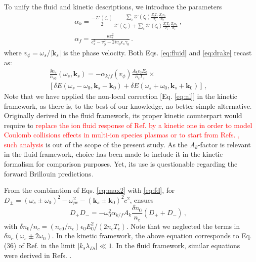 \documentclass[
 reprint,
 superscriptaddress,
 amsmath,amssymb,
 aps,
]{revtex4-1}
\def\tc{\textcolor{red}}
\begin{document}
To unify the fluid and kinetic descriptions, we introduce the parameters
\begin{align}
   \alpha_k  = \frac{-\mathcal{Z}'( \zeta_e) }{2}
 \frac{\sum_i\mathcal{Z}'( \zeta_i)\frac{  Z_iT_e}{ T_i }\frac{  Z_in_i}{ n_e }   }{  \mathcal{Z}'( \zeta_e)+ \sum_i\mathcal{Z}'( \zeta_i)\frac{  Z_iT_e}{ T_i }\frac{ Z_i n_i}{ n_e }  }\, ,\label{eq:alphak} \\
   \alpha_f = \frac{\kappa c_s^2}{ c_s^2-v_\phi^2 -2iv_\phi c_s \gamma_0}\, .\label{eq:alphaf}
\end{align}
where $v_\phi = \omega_s/\vert \mathbf{k}_s\vert $ is the phase velocity.
Both Eqs. \eqref{eq:fluid} and  \eqref{eq:drake} recast as:
\begin{align}
   \frac{\delta n_e }{n_{e0}}(\omega_s,\mathbf{k}_s) = -\alpha_{k/f}(v_\phi) \frac{A_k\epsilon_0 E_0}{n_c T_e}\times \nonumber\\ \left[\delta E(\omega_s-\omega_0, \mathbf{k}_s-\mathbf{k}_0) +\delta E(\omega_s+\omega_0, \mathbf{k}_s+\mathbf{k}_0) \right] \, ,\label{eq:fd}
\end{align}
Note that we have  applied the non-local correction [Eq. \eqref{eq:nl}] in the kinetic framework, as there is, to the best of our knowledge,  no better simple alternative. Originally derived in the fluid framework, its proper kinetic counterpart would require to \tc{replace the ion fluid response of Ref. \cite[]{POP_Berger_2005} by a kinetic one in order to model Coulomb collisions effects in multi-ion species plasmas \cite[]{POP_Berger_2005b} or to start from Refs. \cite[]{POP_Epperlein_94,POP_Bychenkov_1998}, such analysis } is out of the scope of the present study. As the $A_k$-factor is relevant in the fluid framework, choice has been made to include it in the kinetic formalism for comparison purposes. Yet, its use is questionable regarding the forward Brillouin predictions.

From the combination of  Eqs. \eqref{eq:max2} with \eqref{eq:fd}, 
for $D_\pm= (\omega_s\pm \omega_0)^2 - \omega_{pe}^2 -( \mathbf{k}_s\pm \mathbf{k}_0) ^2c^2 $, ensues
\begin{equation}\label{eq:dispe}
    D_+D_- = -\omega_{0}^2\alpha_{k/f}A_k\frac{\delta n_0}{n_c} (D_++D_-) \, ,
\end{equation}
with $\delta n_0/n_c = (n_{e0}/n_c) \epsilon_0E_0^2/(2n_c T_e)$.
Note that we neglected the terms in $\delta n_e(\omega_s \pm 2\omega_0)$.
In the kinetic framework, the above equation corresponds to Eq. (36) of Ref. \cite[]{POF_Cohen_79} in the limit $\vert k_s \lambda_{Di} \vert \ll 1$. In the fluid framework, similar equations were derived in Refs. \cite[]{Kruer,phd_Michel,phd-Grech}.
\end{document}
